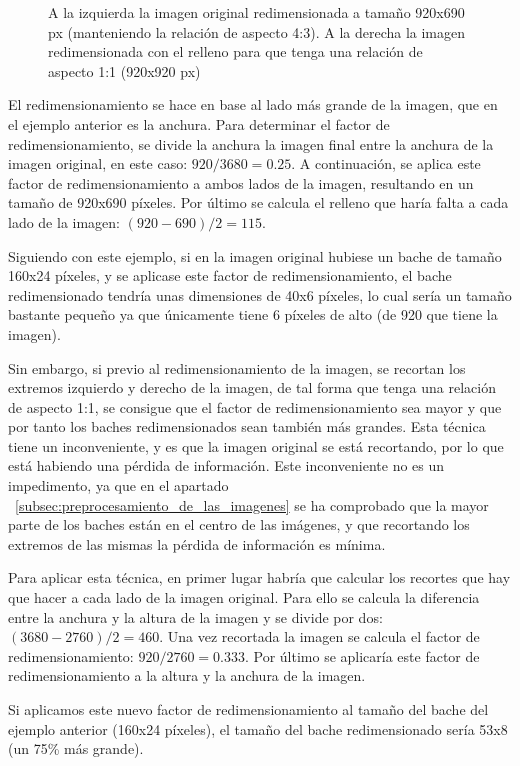 \begin{figure}[H]
\begin{subfigure}[h]{0.45\linewidth}
	\end{subfigure}
	\caption{A la izquierda la imagen original redimensionada a tamaño 920x690 px (manteniendo la relación de aspecto 4:3). A la derecha la imagen redimensionada con el relleno para que tenga una relación de aspecto 1:1 (920x920 px)}
	\label{fig:imagedirectresize}
\end{figure}

El redimensionamiento se hace en base al lado más grande de la imagen, que en el ejemplo anterior es la anchura. Para determinar el factor de redimensionamiento, se divide la anchura la imagen final entre la anchura de la imagen original, en este caso: $920 / 3680 = 0.25$. A continuación, se aplica este factor de redimensionamiento a ambos lados de la imagen, resultando en un tamaño de 920x690 píxeles. Por último se calcula el relleno que haría falta a cada lado de la imagen: $(920 - 690) / 2 = 115$.

Siguiendo con este ejemplo, si en la imagen original hubiese un bache de tamaño 160x24 píxeles, y se aplicase este factor de redimensionamiento, el bache redimensionado tendría unas dimensiones de 40x6 píxeles, lo cual sería un tamaño bastante pequeño ya que únicamente tiene 6 píxeles de alto (de 920 que tiene la imagen).

Sin embargo, si previo al redimensionamiento de la imagen, se recortan los extremos izquierdo y derecho de la imagen, de tal forma que tenga una relación de aspecto 1:1, se consigue que el factor de redimensionamiento sea mayor y que por tanto los baches redimensionados sean también más grandes. Esta técnica tiene un inconveniente, y es que la imagen original se está recortando, por lo que está habiendo una pérdida de información. Este inconveniente no es un impedimento, ya que en el apartado ~\ref{subsec:preprocesamiento_de_las_imagenes} se ha comprobado que la mayor parte de los baches están en el centro de las imágenes, y que recortando los extremos de las mismas la pérdida de información es mínima.

Para aplicar esta técnica, en primer lugar habría que calcular los recortes que hay que hacer a cada lado de la imagen original. Para ello se calcula la diferencia entre la anchura y la altura de la imagen y se divide por dos: $(3680 - 2760) / 2 = 460$. Una vez recortada la imagen se calcula el factor de redimensionamiento: $920 / 2760 = 0.333$. Por último se aplicaría este factor de redimensionamiento a la altura y la anchura de la imagen.

Si aplicamos este nuevo factor de redimensionamiento al tamaño del bache del ejemplo anterior (160x24 píxeles), el tamaño del bache redimensionado sería 53x8 (un 75\% más grande).